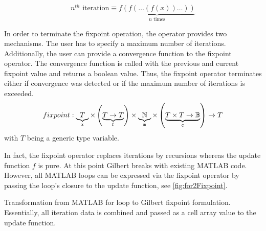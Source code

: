 \begin{displaymath}
  n^{th}\text{ iteration}\equiv\underbrace{f(f(\ldots(f(x))\ldots))}_{\text{$n$ times}}
\end{displaymath}

In order to terminate the fixpoint operation, the operator provides two mechanisms.
The user has to specify a maximum number  of iterations.
Additionally, the user can provide a convergence function  to the fixpoint operator.
The convergence function is called with the previous and current fixpoint value and returns a boolean value.
Thus, the fixpoint operator terminates either if convergence was detected or if the maximum number of iterations is exceeded.
\begin{equation}
fixpoint: \underbrace{T}_{\text{\texttt{x}}} \times \left( \underbrace{T \rightarrow T}_{\text{\texttt{f}}} \right) \times \underbrace{\mathbb{N}}_{\text{\texttt{m}}} \times \left(\underbrace{T\times T \rightarrow \mathbb{B}}_{\text{\texttt{c}}} \right) \rightarrow T
\label{eqn:fixpoint}
\end{equation}
with $T$ being a generic type variable.

In fact, the fixpoint operator replaces iterations by recursions whereas the update function $f$ is pure. At this point Gilbert breaks with existing MATLAB code. However, all MATLAB loops can be expressed via the fixpoint operator by passing the loop's closure to the update function, see \cref{fig:for2Fixpoint}.

\begin{listing}
  \centering
  \caption{Transformation from MATLAB for loop  to Gilbert fixpoint  formulation. Essentially, all iteration data is combined and passed as a cell array value to the update function.}
  \label{fig:for2Fixpoint}
\end{listing}

